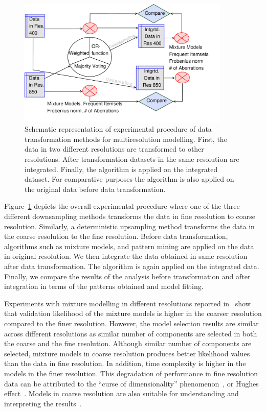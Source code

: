 \begin{figure}[h!]
\centering
\includegraphics[trim=10mm 10mm 30mm 2mm,width=0.9\textwidth]{figures/pub1exp}
\caption[Experimental Procedure in~.]
{Schematic representation of experimental procedure of data transformation 
methods for multiresolution modelling. First, the data in two different 
resolutions are transformed to other resolutions. After transformation 
datasets in the same resolution are integrated. Finally, the algorithm
is applied on the integrated dataset. For comparative purposes the  
algorithm is also applied on the original data before data transformation.} 
\label{Fig:transexp}
\end{figure}
Figure~\ref{Fig:transexp} depicts the overall experimental procedure
where one of the three different downsampling methods transforms the 
data in fine resolution to coarse resolution. Similarly, a deterministic
upsampling method transforms the data in the coarse resolution to the 
fine resolution. Before data transformation, algorithms such as 
mixture models, and pattern mining are applied on the data in original
resolution. We then integrate the data obtained in same resolution after
data transformation. The algorithm is again applied on the  integrated 
data. Finally, we compare the results of the analysis before transformation 
and after integration in terms of the patterns obtained and model fitting.

Experiments with mixture 
modelling in different resolutions reported in~ show that 
validation likelihood of the mixture  models is higher in the coarser 
resolution compared to the finer resolution. However, the model 
selection results are similar across different resolutions as 
similar number of components are selected in both the coarse and 
the fine resolution. Although similar number of components are 
selected, mixture models in coarse resolution produces better 
likelihood values than the data in fine resolution. In addition, 
time complexity is higher in the models in  the finer resolution. 
This degradation of performance in  fine resolution data can be 
attributed to the ``curse of dimensionality'' 
phenomenon~\cite{bellman61}, or Hughes effect~\cite{hughes68}. 
Models in coarse resolution  are also suitable for understanding 
and interpreting the results~\cite{Hollmen2007a}. 


